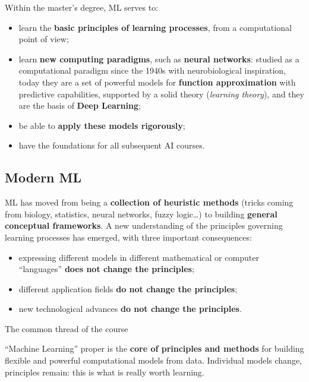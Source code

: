 Within the master's degree, ML serves to:

\begin{itemize}
\tightlist
\item
  learn the \textbf{basic principles of learning processes}, from a
  computational point of view;
\item
  learn \textbf{new computing paradigms}, such as \textbf{neural
  networks}: studied as a computational paradigm since the 1940s with
  neurobiological inspiration, today they are a set of powerful models
  for \textbf{function approximation} with predictive capabilities,
  supported by a solid theory (\emph{learning theory}), and they are
  the basis of \textbf{Deep Learning};
\item
  be able to \textbf{apply these models rigorously};
\item
  have the foundations for all subsequent AI courses.
\end{itemize}

\subsection{Modern ML}\label{il-ml-moderno}

ML has moved from being a \textbf{collection of heuristic methods}
(tricks coming from biology, statistics, neural networks, fuzzy
logic\ldots) to building \textbf{general conceptual frameworks}. A new
understanding of the principles governing learning processes has
emerged, with three important consequences:

\begin{itemize}
\tightlist
\item
  expressing different models in different mathematical or computer
  ``languages'' \textbf{does not change the principles};
\item
  different application fields \textbf{do not change the principles};
\item
  new technological advances \textbf{do not change the principles}.
\end{itemize}

\begin{boxtip}{The common thread of the course}

``Machine Learning'' proper is the \textbf{core of principles and
methods} for building flexible and powerful computational models from
data. Individual models change, principles remain: this is what is
really worth learning.

\end{boxtip}

